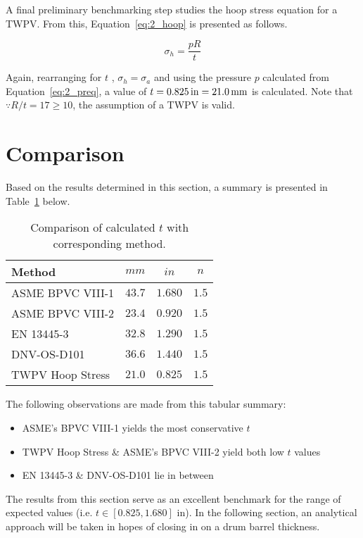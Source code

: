 A final preliminary benchmarking step studies the hoop stress equation \cite{roarks} for a TWPV. From this, Equation~\ref{eq:2_hoop} is presented as follows.

\begin{equation}
	\label{eq:2_hoop}
	\sigma_h = \frac{pR}{t}
\end{equation}

Again, rearranging for $t$ , $\sigma_h=\sigma_a$ and using the pressure $p$ calculated from Equation~\ref{eq:2_preq}, a value of $t =0.825 \,\mathrm{in}=21.0\,\mathrm{mm}$ is calculated. Note that $\because R/t = 17 \geq 10$, the assumption of a TWPV is valid.

\section{Comparison}

Based on the results determined in this section, a summary is presented in Table~\ref{table:2_comp} below.
\begin{table}[H]
	\centering
	\caption{Comparison of calculated $t$ with corresponding method.}
	\begin{tabular}{lccc}
		\textbf{Method}  & \textbf{$mm$} & \textbf{$in$} & \textbf{$n$} \\
		\midrule
		ASME BPVC VIII-1 & $43.7$                 & $1.680$                & $1.5$       \\
		ASME BPVC VIII-2 & $23.4$                 & $0.920$                & $1.5$       \\
		EN 13445-3       & $32.8$                 & $1.290$                & $1.5$       \\    
		DNV-OS-D101      & $36.6$                 & $1.440$                & $1.5$       \\
		TWPV Hoop Stress & $21.0$                 & $0.825$                & $1.5$       \\
	\end{tabular}%
	\label{table:2_comp}%
\end{table}%

The following observations are made from this tabular summary:
\begin{itemize}
	\item ASME's BPVC VIII-1 yields the most conservative $t$
	\item TWPV Hoop Stress \& ASME's BPVC VIII-2 yield both low $t$ values 
	\item EN 13445-3 \& DNV-OS-D101 lie in between \\
\end{itemize}

The results from this section serve as an excellent benchmark for the range of expected values (i.e. $t\in[0.825,1.680]$ in). In the following section, an analytical approach will be taken in hopes of closing in on a drum barrel thickness.
